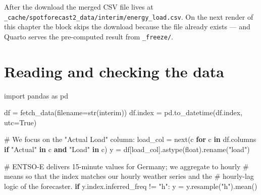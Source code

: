 \documentclass[
  english,
  letterpaper,
]{scrbook}
\newenvironment{Shaded}{\begin{snugshade}}{\end{snugshade}}
\newcommand{\BuiltInTok}[1]{\textcolor[rgb]{0.00,0.23,0.31}{#1}}
\newcommand{\CommentTok}[1]{\textcolor[rgb]{0.37,0.37,0.37}{#1}}
\newcommand{\ControlFlowTok}[1]{\textcolor[rgb]{0.00,0.23,0.31}{\textbf{#1}}}
\newcommand{\ImportTok}[1]{\textcolor[rgb]{0.00,0.46,0.62}{#1}}
\newcommand{\KeywordTok}[1]{\textcolor[rgb]{0.00,0.23,0.31}{\textbf{#1}}}
\newcommand{\NormalTok}[1]{\textcolor[rgb]{0.00,0.23,0.31}{#1}}
\newcommand{\OperatorTok}[1]{\textcolor[rgb]{0.37,0.37,0.37}{#1}}
\newcommand{\StringTok}[1]{\textcolor[rgb]{0.13,0.47,0.30}{#1}}
\newcommand{\VariableTok}[1]{\textcolor[rgb]{0.07,0.07,0.07}{#1}}
\begin{document}
After the download the merged CSV file lives at
\texttt{\_cache/spotforecast2\_data/interim/energy\_load.csv}. On the
next render of this chapter the block skips the download because the
file already exists --- and Quarto serves the pre-computed result from
\texttt{\_freeze/}.

\section{Reading and checking the
data}\label{reading-and-checking-the-data}

\protect{}\label{load-and-check}
\begin{Shaded}
\begin{Highlighting}[]
\ImportTok{import}\NormalTok{ pandas }\ImportTok{as}\NormalTok{ pd}

\NormalTok{df }\OperatorTok{=}\NormalTok{ fetch\_data(filename}\OperatorTok{=}\BuiltInTok{str}\NormalTok{(interim))}
\NormalTok{df.index }\OperatorTok{=}\NormalTok{ pd.to\_datetime(df.index, utc}\OperatorTok{=}\VariableTok{True}\NormalTok{)}

\CommentTok{\# We focus on the "Actual Load" column:}
\NormalTok{load\_col }\OperatorTok{=} \BuiltInTok{next}\NormalTok{(c }\ControlFlowTok{for}\NormalTok{ c }\KeywordTok{in}\NormalTok{ df.columns }\ControlFlowTok{if} \StringTok{"Actual"} \KeywordTok{in}\NormalTok{ c }\KeywordTok{and} \StringTok{"Load"} \KeywordTok{in}\NormalTok{ c)}
\NormalTok{y }\OperatorTok{=}\NormalTok{ df[load\_col].astype(}\BuiltInTok{float}\NormalTok{).rename(}\StringTok{"load"}\NormalTok{)}

\CommentTok{\# ENTSO{-}E delivers 15{-}minute values for Germany; we aggregate to hourly}
\CommentTok{\# means so that the index matches our hourly weather series and the}
\CommentTok{\# hourly{-}lag logic of the forecaster.}
\ControlFlowTok{if}\NormalTok{ y.index.inferred\_freq }\OperatorTok{!=} \StringTok{"h"}\NormalTok{:}
\NormalTok{    y }\OperatorTok{=}\NormalTok{ y.resample(}\StringTok{"h"}\NormalTok{).mean()}


\end{Highlighting}
\end{Shaded}
\end{document}
